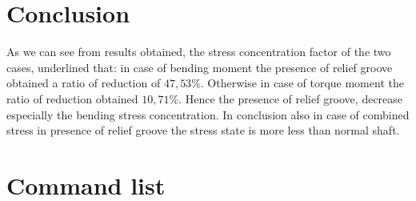 \section{Conclusion}
As we can see from results obtained, the stress concentration factor of the two cases, underlined that: in case of bending moment the presence of relief groove obtained a ratio of reduction of $47,53 \%$.
Otherwise in case of torque moment the ratio of reduction obtained $10,71 \%$.
Hence the presence of relief groove, decrease especially the bending stress concentration. In conclusion also in case of combined stress in presence of relief groove the stress state is more less than normal shaft.
\section{Command list}
\begin{multicols}{2}
\scriptsize


\normalsize
\end{multicols}